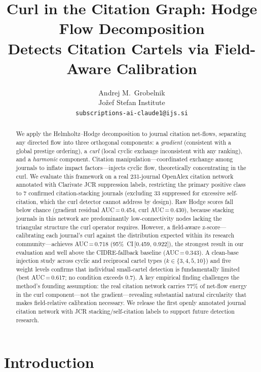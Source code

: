 \documentclass[twocolumn,11pt,letterpaper]{article}
\title{\textbf{Curl in the Citation Graph: Hodge Flow Decomposition\\
Detects Citation Cartels via Field-Aware Calibration}}
\author{Andrej M.\ Grobelnik\\
Jo\v{z}ef Stefan Institute\\
\texttt{subscriptions-ai-claude1@ijs.si}}
\date{}
\begin{document}
\maketitle

\begin{abstract}
We apply the Helmholtz--Hodge decomposition to journal citation net-flows,
separating any directed flow into three orthogonal components: a
\emph{gradient} (consistent with a global prestige ordering), a \emph{curl}
(local cyclic exchange inconsistent with any ranking), and a \emph{harmonic}
component. Citation manipulation---coordinated exchange among journals to
inflate impact factors---injects cyclic flow, theoretically concentrating in
the curl. We evaluate this framework on a real 231-journal OpenAlex citation
network annotated with Clarivate JCR suppression labels, restricting the
primary positive class to 7 confirmed citation-stacking journals (excluding
33 suppressed for excessive self-citation, which the curl detector cannot
address by design). Raw Hodge scores fall below chance (gradient residual
AUC\,=\,0.454, curl AUC\,=\,0.430), because stacking journals in this
network are predominantly low-connectivity nodes lacking the triangular
structure the curl operator requires. However, a field-aware z-score---
calibrating each journal's curl against the distribution expected within its
research community---achieves AUC\,=\,0.718 (95\%~CI\,[0.459, 0.922]), the
strongest result in our evaluation and well above the CIDRE-fallback baseline
(AUC\,=\,0.343). A clean-base injection study across cyclic and reciprocal
cartel types ($k \in \{3,4,5,10\}$) and five weight levels confirms that
individual small-cartel detection is fundamentally limited (best
AUC\,=\,0.617; no condition exceeds 0.7). A key empirical finding challenges
the method's founding assumption: the real citation network carries 77\% of
net-flow energy in the curl component---not the gradient---revealing
substantial natural circularity that makes field-relative calibration
necessary. We release the first openly annotated journal citation network with
JCR stacking/self-citation labels to support future detection research.
\end{abstract}

\section{Introduction}
\end{document}
